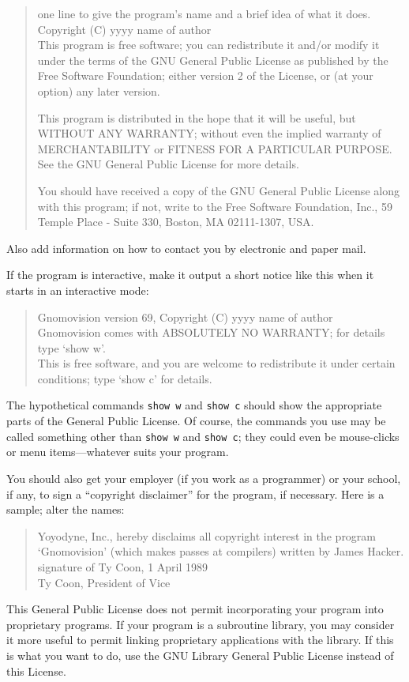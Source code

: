 \documentclass[12pt]{report}
\begin{document}
\begin{quote}
one line to give the program's name and a brief idea of what it does. \\
Copyright (C) yyyy  name of author \\

This program is free software; you can redistribute it and/or modify
it under the terms of the GNU General Public License as published by
the Free Software Foundation; either version 2 of the License, or
(at your option) any later version.

This program is distributed in the hope that it will be useful,
but WITHOUT ANY WARRANTY; without even the implied warranty of
MERCHANTABILITY or FITNESS FOR A PARTICULAR PURPOSE.  See the
GNU General Public License for more details.

You should have received a copy of the GNU General Public License
along with this program; if not, write to the Free Software
Foundation, Inc., 59 Temple Place - Suite 330, Boston, MA  02111-1307, USA.
\end{quote}

Also add information on how to contact you by electronic and paper mail.

If the program is interactive, make it output a short notice like this
when it starts in an interactive mode:

\begin{quote}
Gnomovision version 69, Copyright (C) yyyy  name of author \\
Gnomovision comes with ABSOLUTELY NO WARRANTY; for details type `show w'. \\
This is free software, and you are welcome to redistribute it
under certain conditions; type `show c' for details.
\end{quote}


The hypothetical commands {\tt show w} and {\tt show c} should show the
appropriate parts of the General Public License.  Of course, the commands
you use may be called something other than {\tt show w} and {\tt show c};
they could even be mouse-clicks or menu items---whatever suits your
program.

You should also get your employer (if you work as a programmer) or your
school, if any, to sign a ``copyright disclaimer'' for the program, if
necessary.  Here is a sample; alter the names:

\begin{quote}
Yoyodyne, Inc., hereby disclaims all copyright interest in the program \\
`Gnomovision' (which makes passes at compilers) written by James Hacker. \\

signature of Ty Coon, 1 April 1989 \\
Ty Coon, President of Vice
\end{quote}


This General Public License does not permit incorporating your program
into proprietary programs.  If your program is a subroutine library, you
may consider it more useful to permit linking proprietary applications
with the library.  If this is what you want to do, use the GNU Library
General Public License instead of this License.
\end{document}
